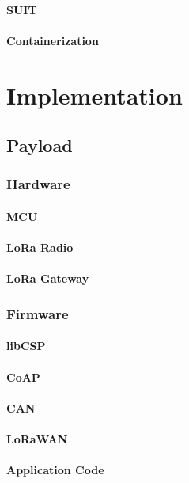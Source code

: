 \documentclass[conference]{IEEEtran}
\begin{document}
\paragraph*{SUIT}
\paragraph*{Containerization}

\section{Implementation}
\label{sec:implementation}

\subsection{Payload}
\label{sec:paylod}
\subsubsection{Hardware}
\paragraph*{MCU}
\paragraph*{LoRa Radio}
\paragraph*{LoRa Gateway}

\subsubsection{Firmware}
\paragraph*{libCSP}
\paragraph*{CoAP}  %
\paragraph*{CAN}
\paragraph*{LoRaWAN}
\paragraph*{Application Code}
\end{document}
